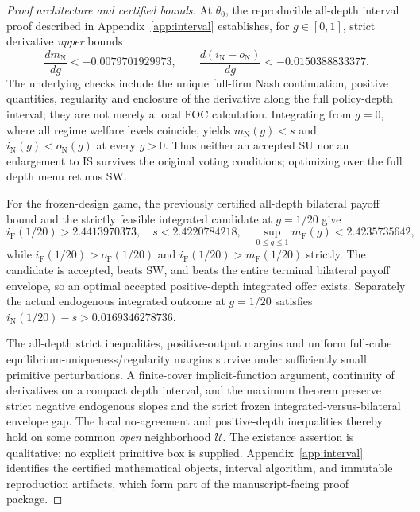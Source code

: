 \documentclass[11pt,a4paper]{article}
\theoremstyle{remark}\newtheorem{remark}[theorem]{Remark}
\newcommand{\SW}{\mathrm{SW}}\newcommand{\SU}{\mathrm{SU}}\newcommand{\IS}{\mathrm{IS}}
\newcommand{\N}{\mathrm{N}}\newcommand{\F}{\mathrm{F}}
\begin{document}
\begin{proof}[Proof architecture and certified bounds]
At $\theta_0$, the reproducible all-depth interval proof described in Appendix~\ref{app:interval} establishes, for $g\in[0,1]$, strict derivative \emph{upper} bounds
\begin{equation}\label{eq:cert}
\frac{dm_{\N}}{dg}<-0.0079701929973,\qquad
\frac{d(i_{\N}-o_{\N})}{dg}<-0.0150388833377.
\end{equation}
The underlying checks include the unique full-firm Nash continuation, positive quantities, regularity and enclosure of the derivative along the full policy-depth interval; they are not merely a local FOC calculation. Integrating from $g=0$, where all regime welfare levels coincide, yields $m_{\N}(g)<s$ and $i_{\N}(g)<o_{\N}(g)$ at every $g>0$. Thus neither an accepted $\SU$ nor an enlargement to $\IS$ survives the original voting conditions; optimizing over the full depth menu returns $\SW$.

For the frozen-design game, the previously certified all-depth bilateral payoff bound and the strictly feasible integrated candidate at $g=1/20$ give
\begin{equation}\label{eq:frozenCert}
 i_{\F}(1/20)>2.4413970373,
\quad s<2.4220784218,
\quad\sup_{0\le g\le1}m_{\F}(g)<2.4235735642,
\end{equation}
while $i_{\F}(1/20)>o_{\F}(1/20)$ and $i_{\F}(1/20)>m_{\F}(1/20)$ strictly. The candidate is accepted, beats $\SW$, and beats the entire terminal bilateral payoff envelope, so an optimal accepted positive-depth integrated offer exists. Separately the actual endogenous integrated outcome at $g=1/20$ satisfies $i_{\N}(1/20)-s>0.0169346278736$.

The all-depth strict inequalities, positive-output margins and uniform full-cube equilibrium-uniqueness/regularity margins survive under sufficiently small primitive perturbations. A finite-cover implicit-function argument, continuity of derivatives on a compact depth interval, and the maximum theorem preserve strict negative endogenous slopes and the strict frozen integrated-versus-bilateral envelope gap. The local no-agreement and positive-depth inequalities thereby hold on some common \emph{open} neighborhood $\mathcal U$. The existence assertion is qualitative; no explicit primitive box is supplied. Appendix~\ref{app:interval} identifies the certified mathematical objects, interval algorithm, and immutable reproduction artifacts, which form part of the manuscript-facing proof package.
\end{proof}
\end{document}
